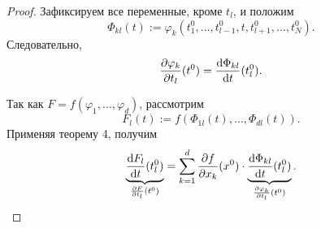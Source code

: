 \documentclass[12pt,a4paper]{report}
\begin{document}
\begin{proof}
    Зафиксируем все переменные, кроме $t_l$, и положим
    \[
    \Phi_{kl}(t):=\varphi_k(t_1^0,\dots,t_{l-1}^0,t,t_{l+1}^0,\dots,t_N^0).
    \]
    Следовательно,
    \[
    \frac{\partial \varphi_k}{\partial t_l}(t^0)=\frac{\d \Phi_{kl}}{\d t}(t_l^0).
    \]

    Так как $F=f(\varphi_1,\dots,\varphi_d)$, рассмотрим
    \[
    F_l(t):=f(\Phi_{1l}(t),\dots,\Phi_{dl}(t)).
    \]
    Применяя теорему 4, получим
    \[
    \underbrace{\frac{\d F_l}{\d t}(t_l^0)}_{\frac{\partial F}{\partial t_l}(t^0)}
    =\sum_{k=1}^d\frac{\partial f}{\partial x_k}(x^0)\cdot
    \underbrace{\frac{\d \Phi_{kl}}{\d t}(t_l^0)}_{\frac{\partial \varphi_k}{\partial t_l}(t^0)}.
    \]
\end{proof}
\end{document}
